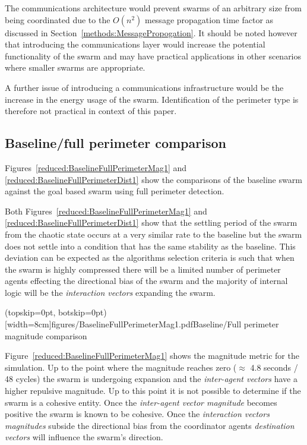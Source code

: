 \documentclass{ieeeaccess}
\begin{document}
The communications architecture would prevent swarms of an arbitrary size from being coordinated due to the $O(n^{2})$ message propagation time factor as discussed in Section~\ref{methods:MessagePropogation}. It should be noted however that introducing the communications layer would increase the potential functionality of the swarm and may have practical applications in other scenarios where smaller swarms are appropriate. 

A further issue of introducing a communications infrastructure would be the increase in the energy usage of the swarm. Identification of the perimeter type is therefore not practical in context of this paper.

\subsection{Baseline/full perimeter comparison\label{section:compareBaselineFullPerimeter}}
Figures~\ref{reduced:BaselineFullPerimeterMag1} and \ref{reduced:BaselineFullPerimeterDist1} show the comparisons of the baseline swarm against the goal based swarm using full perimeter detection. 

Both Figures~\ref{reduced:BaselineFullPerimeterMag1} and \ref{reduced:BaselineFullPerimeterDist1} show that the settling period of the swarm from the chaotic state occurs at a very similar rate to the baseline but the swarm does not settle into a condition that has the same stability as the baseline. This deviation can be expected as the algorithms selection criteria is such that when the swarm is highly compressed there will be a limited number of perimeter agents effecting the directional bias of the swarm and the majority of internal logic will be the \textit{interaction vectors} expanding the swarm.


\Figure[t!](topskip=0pt, botskip=0pt)[width=8cm]{figures/BaselineFullPerimeterMag1.pdf}{Baseline/Full perimeter magnitude comparison\label{reduced:BaselineFullPerimeterMag1}}

Figure~\ref{reduced:BaselineFullPerimeterMag1} shows the magnitude metric for the simulation. Up to the point where the magnitude reaches zero ($\approx$ 4.8 seconds / 48 cycles) the swarm is undergoing expansion and the \textit{inter-agent vectors} have a higher repulsive magnitude. Up to this point it is not possible to determine if the swarm is a cohesive entity. Once the \textit{inter-agent vector magnitude} becomes positive the swarm is known to be cohesive. Once the \textit{interaction vectors magnitudes} subside the directional bias from the coordinator agents \textit{destination vectors} will influence the swarm's direction. 
\end{document}
